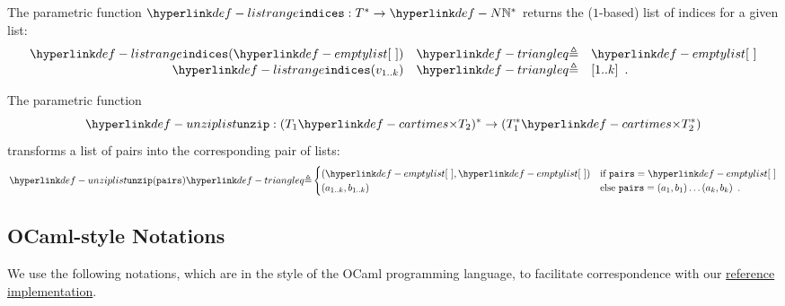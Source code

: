 \hypertarget{def-listrange}{}
\begin{definition}
The parametric function $\listrange : T^* \rightarrow \N^*$ returns the ($1$-based) list of indices for a given list:
\[
    \begin{array}{rcl}
        \listrange(\emptylist) &\triangleq& \emptylist\\
        \listrange(v_{1..k}) &\triangleq& [1..k] \enspace.
    \end{array}
\]
\end{definition}


\hypertarget{def-unziplist}{}
\begin{definition}
The parametric function
\[
\unziplist : (T_1 \cartimes T_2)^* \rightarrow (T_1^* \cartimes T_2^*)
\]
transforms a list of pairs into the corresponding pair of lists:
\[
  \unziplist(\pairs) \triangleq \begin{cases}
    (\emptylist, \emptylist)  & \text{if }\pairs = \emptylist\\
    (a_{1..k}, b_{1..k})      & \text{else }\pairs = (a_1,b_1) \ldots (a_k,b_k)  \enspace.
  \end{cases}
\]
\end{definition}

\subsection{OCaml-style Notations}
We use the following notations, which are in the style of the OCaml programming language,
to facilitate correspondence with our
\href{https://github.com/herd/herdtools7/tree/master/asllib}{reference implementation}.


